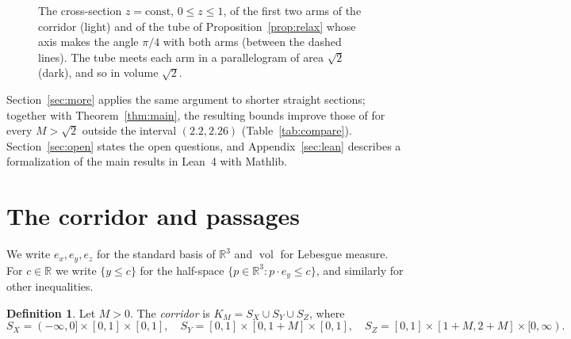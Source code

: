 \documentclass[11pt]{amsart}
\theoremstyle{definition}
\newtheorem{definition}[theorem]{Definition}
\theoremstyle{remark}
\numberwithin{equation}{section}
\newcommand{\R}{\mathbb{R}}
\newcommand{\vol}{\operatorname{vol}}
\begin{document}
\begin{figure}[ht]
\centering
{}
\caption{The cross-section $z=\mathrm{const}$, $0\le z\le1$, of the first two arms of the corridor (light) and of the tube of Proposition~\ref{prop:relax} whose axis makes the angle $\pi/4$ with both arms (between the dashed lines). The tube meets each arm in a parallelogram of area $\sqrt2$ (dark), and so in volume $\sqrt2$.}\label{fig:strip}
\end{figure}

Section~\ref{sec:more} applies the same argument to shorter straight sections; together with Theorem~\ref{thm:main}, the resulting bounds improve those of \cite{Tan26a} for every $M>\sqrt2$ outside the interval $(2.2,2.26)$ (Table~\ref{tab:compare}). Section~\ref{sec:open} states the open questions, and Appendix~\ref{sec:lean} describes a formalization of the main results in Lean~4 with Mathlib.

\section{The corridor and passages}\label{sec:setup}

We write $e_x,e_y,e_z$ for the standard basis of $\R^3$ and $\vol$ for Lebesgue measure. For $c\in\R$ we write $\{y\le c\}$ for the half-space $\{p\in\R^3:p\cdot e_y\le c\}$, and similarly for other inequalities.

\begin{definition}\label{def:corridor}
Let $M>0$. The \emph{corridor} is $K_M=S_X\cup S_Y\cup S_Z$, where
\[
S_X=(-\infty,0]\times[0,1]\times[0,1],\quad S_Y=[0,1]\times[0,1+M]\times[0,1],\quad S_Z=[0,1]\times[1+M,2+M]\times[0,\infty).
\]
\end{definition}
\end{document}
